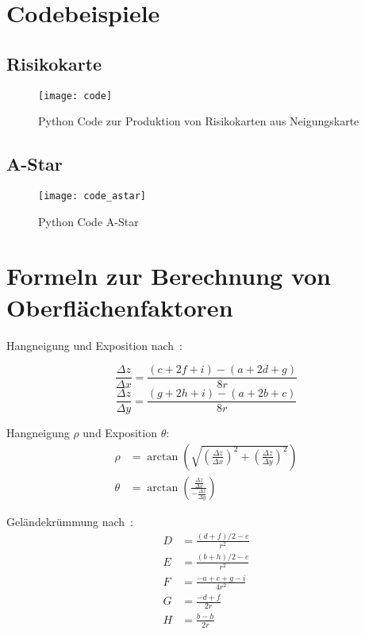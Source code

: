 
\section{Codebeispiele}\label{app:sourcecode}
\subsection{Risikokarte}
\begin{figure}[H]
  \centering
  \texttt{[image: code]}
  \caption{Python Code zur Produktion von Risikokarten aus Neigungskarte}\label{fig:python}
\end{figure}
\subsection{A-Star}
\begin{figure}[H]
  \centering
  \texttt{[image: code\_astar]}
  \caption{Python Code A-Star}\label{fig:pythonastar}
\end{figure}



\pagebreak
\section{Formeln zur Berechnung von Oberflächenfaktoren}\label{app:formeln}
Hangneigung und Exposition nach~\cite{gisslopeaspect}:

\begin{equation} \label{eq1}
  \frac{\Delta z}{\Delta x} = \frac{(c + 2f + i) - (a + 2d + g)}{8r}
\end{equation}
\begin{equation} \label{eq2}
  \frac{\Delta z}{\Delta y} = \frac{(g + 2h + i) - (a + 2b + c)}{8r}
\end{equation}

Hangneigung $\rho$ und Exposition $\theta$:
\begin{align}
  \rho &= \arctan \left( \sqrt{
    {\left( \frac{\Delta z}{\Delta x}\right)}^2 + 
    {\left(\frac{\Delta z}{\Delta y}\right)}^2}
  \right)\\
  \theta &= \arctan\left(\frac{\frac{\Delta z}{\Delta x}}{-\frac{\Delta z}{\Delta y}}\right)
\end{align}

Geländekrümmung nach~\cite{gismath}:
\begin{align}
  D &= \frac{{(d + f) / 2 - e}}{{r^2}} \\
  E &= \frac{{(b + h) / 2 - e}}{{r^2}} \\
  F &= \frac{{-a + c + g - i}}{{4r^2}} \\
  G &= \frac{{-d + f}}{{2r}} \\
  H &= \frac{{b - h}}{{2r}}
\end{align}

